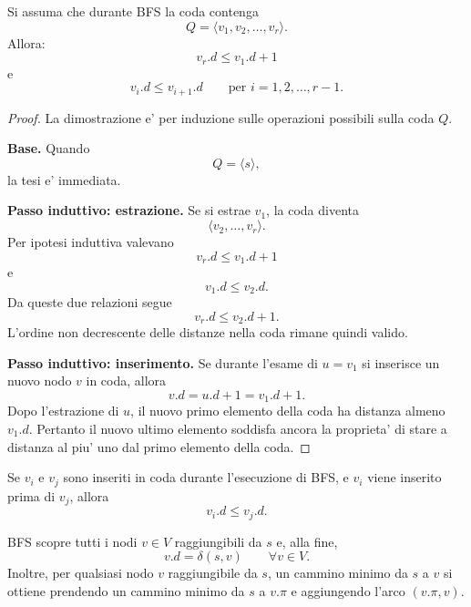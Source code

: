\begin{lemma}
Si assuma che durante BFS la coda contenga
\[
Q=\langle v_1,v_2,\ldots,v_r\rangle.
\]
Allora:
\[
v_r.d\le v_1.d+1
\]
e
\[
v_i.d\le v_{i+1}.d\qquad\text{per }i=1,2,\ldots,r-1.
\]
\end{lemma}

\begin{proof}
La dimostrazione e' per induzione sulle operazioni possibili sulla coda $Q$.

\textbf{Base.}
Quando
\[
Q=\langle s\rangle,
\]
la tesi e' immediata.

\textbf{Passo induttivo: estrazione.}
Se si estrae $v_1$, la coda diventa
\[
\langle v_2,\ldots,v_r\rangle.
\]
Per ipotesi induttiva valevano
\[
v_r.d\le v_1.d+1
\]
e
\[
v_1.d\le v_2.d.
\]
Da queste due relazioni segue
\[
v_r.d\le v_2.d+1.
\]
L'ordine non decrescente delle distanze nella coda rimane quindi valido.

\textbf{Passo induttivo: inserimento.}
Se durante l'esame di $u=v_1$ si inserisce un nuovo nodo $v$ in coda, allora
\[
v.d=u.d+1=v_1.d+1.
\]
Dopo l'estrazione di $u$, il nuovo primo elemento della coda ha distanza almeno $v_1.d$. Pertanto il nuovo ultimo elemento soddisfa ancora la proprieta' di stare a distanza al piu' uno dal primo elemento della coda.
\end{proof}

\begin{corollario}
Se $v_i$ e $v_j$ sono inseriti in coda durante l'esecuzione di BFS, e $v_i$ viene inserito prima di $v_j$, allora
\[
v_i.d\le v_j.d.
\]
\end{corollario}

\begin{teorema}
\textsc{BFS} scopre tutti i nodi $v\in V$ raggiungibili da $s$ e, alla fine,
\[
v.d=\delta(s,v)\qquad\forall v\in V.
\]
Inoltre, per qualsiasi nodo $v$ raggiungibile da $s$, un cammino minimo da $s$ a $v$ si ottiene prendendo un cammino minimo da $s$ a $v.\pi$ e aggiungendo l'arco $(v.\pi,v)$.
\end{teorema}

